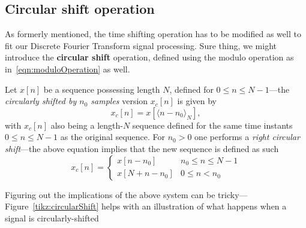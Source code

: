 \documentclass[\documentfontsize, twocolumn]{\classname}
\begin{document}
\subsection{Circular shift operation}
As formerly mentioned, the time shifting operation has to be modified as well to fit our Discrete Fourier Transform signal processing. Sure thing, we might introduce the \textbf{circular shift} operation, defined using the modulo operation as in~\ref{eqn:moduloOperation} as well.

Let $x[n]$ be a sequence possessing length $N$, defined for $0 \leq n \leq N-1$---the \emph{circularly shifted by $n_0$ samples} version $x_c[n]$ is given by
\begin{equation}\label{eqn:circularShift}
    x_c[n] = x[\langle n - n_0 \rangle_N],
\end{equation}
with $x_c[n]$ also being a length-$N$ sequence defined for the same time instants $0\leq n \leq N-1$ as the original sequence. For $n_0 > 0$ one performs a \emph{right circular shift}---the above equation implies that the new sequence is defined as such
\[
    x_c[n] =
    \left\{
        \begin{array}{ll}
            x[n - n_0] & n_0 \leq n \leq N-1\\
            x[N + n - n_0] & 0 \leq n < n_0
        \end{array}
    \right.
\]

Figuring out the implications of the above system can be tricky---Figure~\ref{tikz:circularShift} helps with an illustration of what happens when a signal is circularly-shifted
\end{document}
